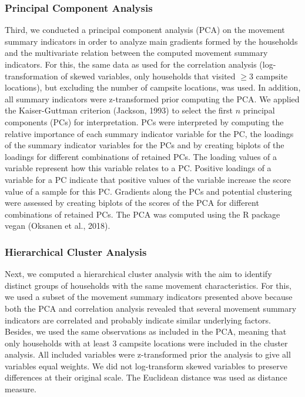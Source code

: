 \documentclass[]{elsarticle} %
\begin{document}
\hypertarget{principal-component-analysis}{%
\subsubsection{Principal Component
Analysis}\label{principal-component-analysis}}

Third, we conducted a principal component analysis (PCA) on the movement
summary indicators in order to analyze main gradients formed by the
households and the multivariate relation between the computed movement
summary indicators. For this, the same data as used for the correlation
analysis (log-transformation of skewed variables, only households that
visited \(\ge 3\) campsite locations), but excluding the number of
campsite locations, was used. In addition, all summary indicators were
z-transformed prior computing the PCA. We applied the Kaiser-Guttman
criterion (Jackson, 1993) to select the first \(n\) principal components
(PCs) for interpretation. PCs were interpreted by computing the relative
importance of each summary indicator variable for the PC, the loadings
of the summary indicator variables for the PCs and by creating biplots
of the loadings for different combinations of retained PCs. The loading
values of a variable represent how this variable relates to a PC.
Positive loadings of a variable for a PC indicate that positive values
of the variable increase the score value of a sample for this PC.
Gradients along the PCs and potential clustering were assessed by
creating biplots of the scores of the PCA for different combinations of
retained PCs. The PCA was computed using the R package vegan (Oksanen et
al., 2018).

\hypertarget{hierarchical-cluster-analysis}{%
\subsubsection{Hierarchical Cluster
Analysis}\label{hierarchical-cluster-analysis}}

Next, we computed a hierarchical cluster analysis with the aim to
identify distinct groups of households with the same movement
characteristics. For this, we used a subset of the movement summary
indicators presented above because both the PCA and correlation analysis
revealed that several movement summary indicators are correlated and
probably indicate similar underlying factors. Besides, we used the same
observations as included in the PCA, meaning that only households with
at least 3 campsite locations were included in the cluster analysis. All
included variables were z-transformed prior the analysis to give all
variables equal weights. We did not log-transform skewed variables to
preserve differences at their original scale. The Euclidean distance was
used as distance measure.
\end{document}
